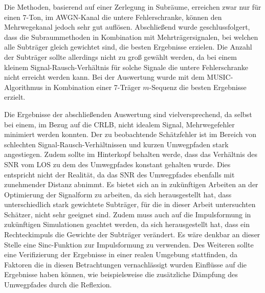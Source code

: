 Die Methoden, basierend auf einer Zerlegung in Subräume, erreichen zwar nur für einen 7-Ton, im \gls{AWGN}-Kanal die untere Fehlerschranke, können den Mehrwegekanal jedoch sehr gut auflösen. 
Abschließend wurde geschlussfolgert, dass die Subraummethoden in Kombination mit Mehrträgersignalen, bei welchen alle Subträger gleich gewichtet sind, die besten Ergebnisse erzielen. Die Anzahl der Subträger sollte allerdings nicht zu groß gewählt werden, da bei einem kleinem Signal-Rausch-Verhältnis für solche Signale die untere Fehlerschranke nicht erreicht werden kann. Bei der Auswertung wurde mit dem MUSIC-Algorithmus in Kombination einer 7-Träger $m$-Sequenz die besten Ergebnisse erzielt. 


Die Ergebnisse der abschließenden Auswertung sind vielversprechend, da selbst bei einem, im Bezug auf die \gls{CRLB}, nicht idealem Signal, Mehrwegefehler minimiert werden konnten. Der zu beobachtende Schätzfehler ist im Bereich von schlechten Signal-Rausch-Verhältnissen und kurzen Umwegpfaden stark angestiegen. Zudem sollte im Hinterkopf behalten werde, dass das Verhältnis des \gls{SNR} vom \gls{LOS} zu dem des Umwegpfades konstant gehalten wurde. Dies entspricht nicht der Realität, da das \gls{SNR} des Umwegpfades ebenfalls mit zunehmender Distanz abnimmt.  
Es bietet sich an in zukünftigen Arbeiten an der Optimierung der Signalform zu arbeiten, da sich herausgestellt hat, dass unterschiedlich stark gewichtete Subträger, für die in dieser Arbeit untersuchten Schätzer, nicht sehr geeignet sind. Zudem muss auch auf die Impulsformung in zukünftigen Simulationen geachtet werden, da sich herausgestellt hat, dass ein Rechteckimpuls die Gewichte der Subträger verändert. Es wäre denkbar an dieser Stelle eine Sinc-Funktion zur Impulsformung zu verwenden.
Des Weiteren sollte eine Verifizierung der Ergebnisse in einer realen Umgebung stattfinden, da Faktoren die in diesen Betrachtungen vernachlässigt wurden Einflüsse auf die Ergebnisse haben können, wie beispielsweise die zusätzliche Dämpfung des Umwegpfades durch die Reflexion.

